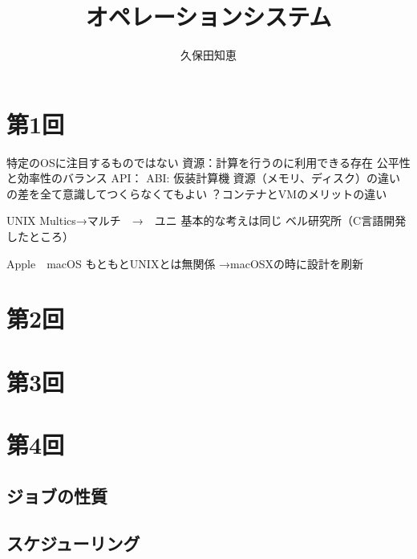 \documentclass{jsarticle}
\begin{document}
\title{オペレーションシステム}

\author{久保田知恵}
\maketitle

\section{第1回}
特定のOSに注目するものではない
資源：計算を行うのに利用できる存在
公平性と効率性のバランス
API：
ABI:
仮装計算機
資源（メモリ、ディスク）の違いの差を全て意識してつくらなくてもよい
？コンテナとVMのメリットの違い

UNIX
Multics→マルチ　→　ユニ
基本的な考えは同じ
ベル研究所（C言語開発したところ）

Apple　macOS
もともとUNIXとは無関係
→macOSXの時に設計を刷新
\section{第2回}
\section{第3回}
\section{第4回}
\subsection{ジョブの性質}
\subsection{スケジューリング}
\end{document}
